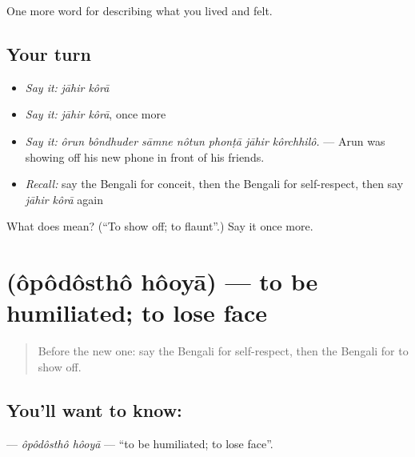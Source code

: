\begin{grammarlens}[title={What you've built}]
One more word for describing what you lived and felt.
\end{grammarlens}

\subsection*{Your turn}
\begin{itemize}
\raggedright
  \item \emph{Say it:} \emph{jāhir kôrā}
  \item \emph{Say it:} \emph{jāhir kôrā}, once more
  \item \emph{Say it:} \emph{ôrun bôndhuder sāmne nôtun phonṭā jāhir kôrchhilô.} — Arun was showing off his new phone in front of his friends.
  \item \emph{Recall:} say the Bengali for conceit, then the Bengali for self-respect, then say \emph{jāhir kôrā} again
\end{itemize}

\begin{tcolorbox}[breakable,colback=teal!4,colframe=teal!35!black,title={Before you move on}]
What does   mean? (\textquotedblleft{}To show off; to flaunt\textquotedblright{}.) Say it once more.
\end{tcolorbox}
\section[\texorpdfstring{\bn{অপদস্থ} \bn{হওয়া} (ôpôdôsthô hôoyā)}{অপদস্থ হওয়া (ôpôdôsthô hôoyā)}]{  (ôpôdôsthô hôoyā) — to be humiliated; to lose face}

\label{lesson:BN-C452-opodostho-hooya}



\begin{quote}
Before the new one: say the Bengali for self-respect, then the Bengali for to show off.
\end{quote}

\subsection*{You'll want to know:  }
\textbf{ } — \emph{ôpôdôsthô hôoyā} — \textquotedblleft{}to be humiliated; to lose face\textquotedblright{}.

\begin{quote}
       
\end{quote}

